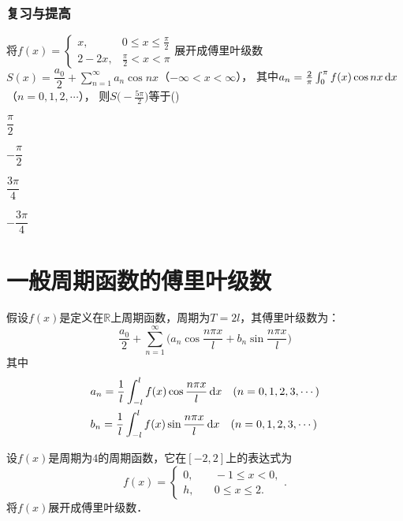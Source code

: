 \documentclass[14pt,notheorems,leqno,xcolor={rgb}]{beamer} %
\begin{document}

\begin{frame}
\frametitle{复习与提高}
\vspace{-1em}%
\begin{choice}%
将$f(x)=\begin{cases}
  x, & 0\le x\le \frac{\pi}{2} \\
  2-2x, & \frac{\pi}{2}<x<\pi
\end{cases}$展开成傅里叶级数
$S(x)=\dfrac{a_0}{2}+\sum\limits_{n=1}^{\infty}a_n\cos nx$（$-\infty<x<\infty$），
其中$a_n=\frac{2}{\pi}\int_0^{\pi}f(x)\cos nx\mathop{}\!\mathrm{d} x$（$n=0,1,2,\cdots$），\vspace{0.5em}%
则$S\big(\!-\frac{5\pi}2\big)$等于\dotfill()
\begin{choicequar}
  \item $\dfrac{\pi}{2}$  ~
  \item $-\dfrac{\pi}{2}$ ~
  \item $\dfrac{3\pi}{4}$ ~
  \item $-\dfrac{3\pi}{4}$ ~
\end{choicequar}
\end{choice}
\end{frame}

\section{一般周期函数的傅里叶级数}

\begin{frame}
假设$f(x)$是定义在$\mathbb{R}$上周期函数，周期为$T=2l$，其傅里叶级数为： 
\[
\frac{a_{0}}{2}+\sum_{n=1}^{\infty}\bigg(a_{n}\cos\frac{n\pi x}{l}+b_{n}\sin\frac{n\pi x}{l}\bigg)
\]
其中
\begin{align*}
 & a_{n}=\frac{1}{l}\int_{-l}^{l}f(x)\cos\frac{n\pi x}{l}\mathop{}\!\mathrm{d} x\quad(n=0,1,2,3,\cdots)\\
 & b_{n}=\frac{1}{l}\int_{-l}^{l}f(x)\sin\frac{n\pi x}{l}\mathop{}\!\mathrm{d} x\quad(n=0,1,2,3,\cdots)
\end{align*}
\end{frame}

\begin{frame}
\begin{example}
设$f(x)$是周期为$4$的周期函数，它在$[-2,2]$上的表达式为
\[ f(x)=\left\{\begin{array}{ll}
0, & \quad -1 \leq x < 0,\\
h, & \quad 0 \leq x \leq 2.
\end{array}\right.. \]
将$f(x)$展开成傅里叶级数．
\end{example}
\end{frame}
\end{document}
